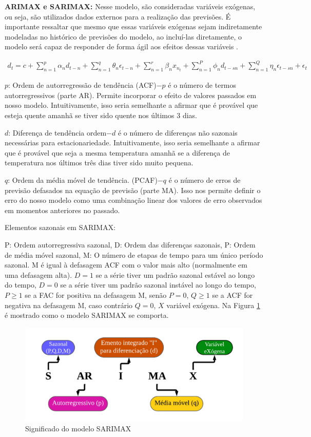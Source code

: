  \textbf{ARIMAX e SARIMAX:}
 Nesse modelo, são consideradas variáveis exógenas, ou seja, são utilizados dados externos para a realização das previsões. É importante ressaltar que mesmo que essas variáveis exógenas sejam indiretamente modeladas no histórico de previsões do modelo, ao incluí-las diretamente, o modelo será capaz de responder de forma ágil aos efeitos dessas variáveis  \cite{sarima}.
 
 \begin{eqnarray}
 	d_t=c+\sum_{n=1}^p \alpha_n d_{t-n}+\sum_{n=1}^q \theta_n \epsilon_{t-n}+\sum_{n=1}^r \beta_n x_{n_t}+\sum_{n=1}^P \phi_n d_{t-s n}+\sum_{n=1}^Q \eta_n \epsilon_{t-s n}+\epsilon_t \label{eq:sarmax}
 \end{eqnarray}
 
 $p$: Ordem de autorregressão de tendência (ACF)$-p$ é o número de termos autorregressivos (parte AR). Permite incorporar o efeito de valores passados em nosso modelo. Intuitivamente, isso seria semelhante a afirmar que é provável que esteja quente amanhã se tiver sido quente nos últimos 3 dias.
 
 $d$: Diferença de tendência ordem$-d$ é o número de diferenças não sazonais necessárias para estacionariedade. Intuitivamente, isso seria semelhante a afirmar que é provável que seja a mesma temperatura amanhã se a diferença de temperatura nos últimos três dias tiver sido muito pequena.
 
 $q$: Ordem da média móvel de tendência. (PCAF)$-q$ é o número de erros de previsão defasados na equação de previsão (parte MA). Isso nos permite definir o erro do nosso modelo como uma combinação linear dos valores de erro observados em momentos anteriores no passado.
 
 Elementos sazonais em SARIMAX:
 
 P: Ordem autorregressiva sazonal,
 D: Ordem das diferenças sazonais,
 P: Ordem de média móvel sazonal,
 M: O número de etapas de tempo para um único período sazonal.
 M é igual à defasagem ACF com o valor mais alto (normalmente em uma defasagem alta).
 $D=1$ se a série tiver um padrão sazonal estável ao longo do tempo,
 $D=0$ se a série tiver um padrão sazonal instável ao longo do tempo,
 $P\geq1$ se a FAC for positiva na defasagem M, senão $P=0$,
 $Q\geq1$ se a ACF for negativa na defasagem M, caso contrário $Q=0$,
 $X$ variável exógena.
 Na Figura \ref{fig:sarimaxmap} é mostrado como o modelo SARIMAX se comporta.
 
 
 \begin{figure}[H]
 	\centering
 	\caption{Significado do modelo SARIMAX}
 	\label{fig:sarimaxmap}
 	\includegraphics[width=0.7\linewidth]{Modelos/Figuras/sarimax_map}
 	
 \end{figure}
 
